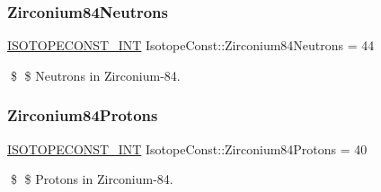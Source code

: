 \subsubsection{\texorpdfstring{Zirconium84\+Neutrons}{Zirconium84Neutrons}}
{\footnotesize\ttfamily \mbox{\hyperlink{group___isotope_const-_macros_ga5f18360b3e99483a35c32d789e62621c}{I\+S\+O\+T\+O\+P\+E\+C\+O\+N\+S\+T\+\_\+\+I\+NT}} Isotope\+Const\+::\+Zirconium84\+Neutrons = 44}

\$ \$ Neutrons in Zirconium-\/84. \mbox{\label{group___isotope_const-_zirconium-_zr84_gaaba787de952b7749b95d6155382027dd}} 
\subsubsection{\texorpdfstring{Zirconium84\+Protons}{Zirconium84Protons}}
{\footnotesize\ttfamily \mbox{\hyperlink{group___isotope_const-_macros_ga5f18360b3e99483a35c32d789e62621c}{I\+S\+O\+T\+O\+P\+E\+C\+O\+N\+S\+T\+\_\+\+I\+NT}} Isotope\+Const\+::\+Zirconium84\+Protons = 40}

\$ \$ Protons in Zirconium-\/84. 